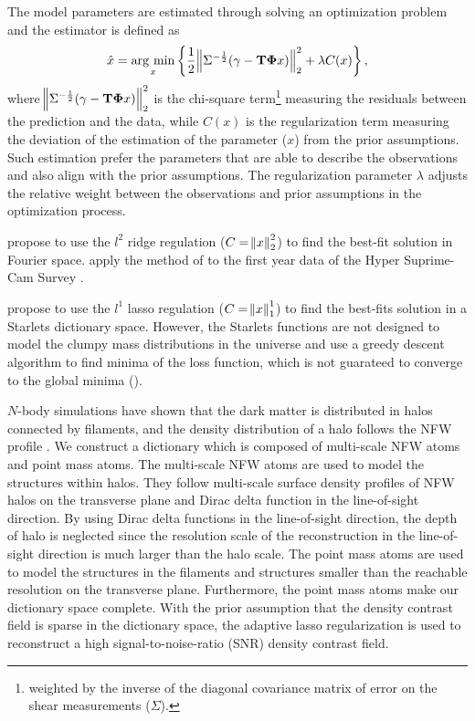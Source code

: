\documentclass[twocolumn]{aastex62}
\newcommand{\argmin}{\mathop{\rm arg~min}\limits}
\newcommand \redColor{\color{red}}
\begin{document}
The model parameters are estimated through solving an optimization problem and the estimator is defined as
\begin{equation}
\hat{x}=\argmin_{x} \left\{ \frac{1}{2}\norm{\Sigma^{-\frac{1}{2}}(\gamma- \mathbf{T\Phi} x)}_2^2+ \lambda C(x) \right\},
\end{equation}
where $\norm{\Sigma^{-\frac{1}{2}}(\gamma - \mathbf{T\Phi} x)}_2^2$ is the chi-square term\footnote{weighted by the
inverse of the diagonal covariance matrix of error on the shear measurements ($\Sigma$).} measuring
the residuals between the prediction and the data, while $C(x)$ is the regularization term measuring the deviation of
the estimation of the parameter ($x$) from the prior assumptions. Such estimation prefer the parameters that are able
to describe the observations and also align with the prior assumptions. The regularization parameter $\lambda$ adjusts 
the relative weight between the observations and prior assumptions in the optimization process.

\citet{LSS-massMap-Wiener-Simon2009} propose to use the $l^2$ ridge regulation ($C=\norm{x}^2_2$) to find the best-fit 
solution in Fourier space. \citet{HSC1-massMaps} apply the method of \citet{LSS-massMap-Wiener-Simon2009} to the first 
year data of the Hyper Suprime-Cam Survey \citep{HSC1-data}. 
{\redColor{Why we use $l^1$ in this paper, what is the difference between $l^1$ and $l^2$.}}

\citet{LSS-massMap-Glimpse3D-Leonard2014} propose to use the $l^1$ lasso regulation ($C=\norm{x}^1_1$) to find the
best-fits solution in a Starlets dictionary space. However, the Starlets functions are not designed to model the 
clumpy mass distributions in the universe and \citet{LSS-massMap-Glimpse3D-Leonard2014} use a greedy descent algorithm 
to find minima of the loss function, which is not guarateed to converge to the global minima ({\redColor{cite..}}).

$N$-body simulations have shown that the dark matter is distributed in halos connected by filaments, and the density 
distribution of a halo follows the NFW profile \citep{halo-NFW1997ApJ}.
We construct a dictionary which is composed of multi-scale NFW atoms and point mass atoms. The multi-scale NFW atoms are used 
to model the structures within halos. They follow multi-scale surface density profiles of NFW halos \citep{haloModel-TJ2003-3pt}
on the transverse plane and Dirac delta function in the line-of-sight direction. By using Dirac delta functions in the 
line-of-sight direction, the depth of halo is neglected \citep{LSS-massMap-Glimpse3D-Leonard2014} since the resolution 
scale of the reconstruction in the line-of-sight direction is much larger than the halo scale.
The point mass atoms are used to model the structures in the filaments and structures smaller than the reachable resolution
on the transverse plane. Furthermore, the point mass atoms make our dictionary space complete.
With the prior assumption that the density contrast field is sparse in the dictionary space, the adaptive lasso regularization
\citep{AdaLASSO-Zou2006} is used to reconstruct a high signal-to-noise-ratio (SNR) density contrast field.
\end{document}
